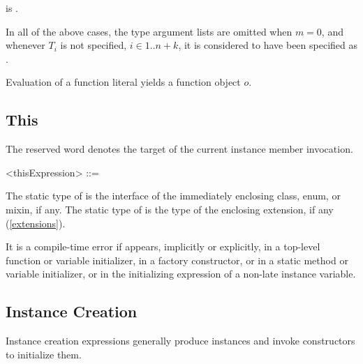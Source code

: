 \documentclass[makeidx]{article}
\begin{document}
{\noindent
is
.
\EndCase

\LMHash{}%
In all of the above cases,
the type argument lists are omitted when $m=0$,
and whenever $T_i$ is not specified, $i \in 1 .. n+k$,
it is considered to have been specified as \DYNAMIC.

\LMHash{}%
Evaluation of a function literal yields a function object $o$.



\subsection{This}

\LMHash{}%
The reserved word \THIS{} denotes
the target of the current instance member invocation.

\begin{grammar}
<thisExpression> ::= \THIS{}
\end{grammar}

\LMHash{}%
The static type of \THIS{} is the interface of the
immediately enclosing class, enum, or mixin, if any.
The static type of \THIS{} is
the \ON{} type of the enclosing extension, if any
(\ref{extensions}).


\LMHash{}%
It is a compile-time error if \THIS{} appears, implicitly or explicitly,
in a top-level function or variable initializer, in a factory constructor,
or in a static method or variable initializer,
or in the initializing expression of a non-late instance variable.


\subsection{Instance Creation}

\LMHash{}%
Instance creation expressions generally produce instances
and invoke constructors to initialize them.


}
\end{document}

